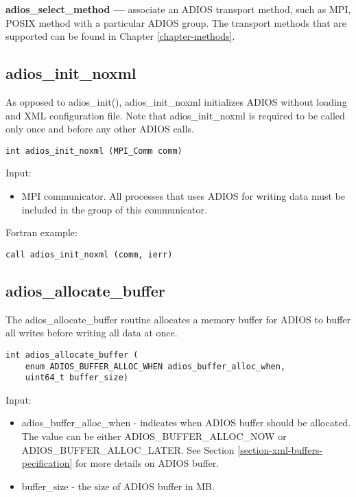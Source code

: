 \textbf{adios\_select\_method ---} associate an ADIOS transport method, such as MPI, 
POSIX method with a particular ADIOS group. The transport methods that are supported 
can be found in Chapter \ref{chapter-methods}.

\subsection{adios\_init\_noxml}

As opposed to adios\_init(), adios\_init\_noxml initializes ADIOS without loading
and XML configuration file. Note that adios\_init\_noxml is required to be called only 
once and before any other ADIOS calls. 

\begin{lstlisting}[alsolanguage=C,caption={},label={}]
int adios_init_noxml (MPI_Comm comm)
\end{lstlisting}

Input: 
\begin{itemize}
\item MPI communicator. All processes that uses ADIOS for writing data must be included in the group of this communicator.
\end{itemize}

Fortran example: 
\begin{lstlisting}[alsolanguage=Fortran,caption={},label={}]
call adios_init_noxml (comm, ierr)
\end{lstlisting}


\subsection{adios\_allocate\_buffer}

The adios\_allocate\_buffer routine allocates a memory buffer for ADIOS to buffer all writes before writing all data at once. 

\begin{lstlisting}[alsolanguage=C,caption={},label={}]
int adios_allocate_buffer (
    enum ADIOS_BUFFER_ALLOC_WHEN adios_buffer_alloc_when,
    uint64_t buffer_size)
\end{lstlisting}

Input: 
\begin{itemize}
\item adios\_buffer\_alloc\_when - indicates when ADIOS buffer should be allocated. 
The value can be either {\small ADIOS\_BUFFER\_ALLOC\_NOW} or 
{\small ADIOS\_BUFFER\_ALLOC\_LATER}. See Section \ref{section-xml-buffers-pecification} 
for more details on ADIOS buffer.
\item buffer\_size - the size of ADIOS buffer in MB. 
\end{itemize}



